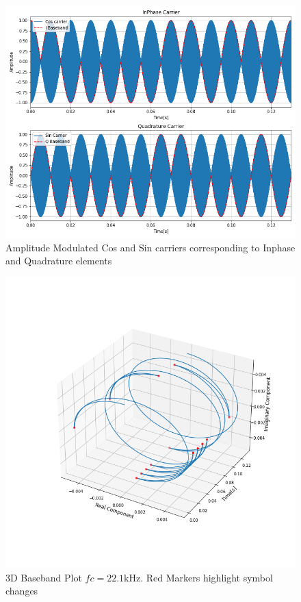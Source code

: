\begin{figure}[h!]
    \centering
    \includegraphics[width = \textwidth]{figs/sim/carrier.png}
    \caption{\centering Amplitude Modulated Cos and Sin carriers corresponding to Inphase and Quadrature elements}
    \label{fig:carrier}
\end{figure}
\begin{figure}[h!]
    \centering
    \includegraphics[height = \textwidth]{figs/sim/3dbaseband.png}
    \caption{3D Baseband Plot $fc = 22.1\si{\kilo\hertz}$. \small{Red Markers highlight symbol changes}}
    \label{fig:3DBB}
\end{figure}

